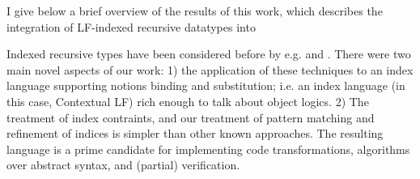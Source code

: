 \documentclass{article}
\begin{document}

I give below a brief overview of the results of this work, which
describes the integration of LF-indexed recursive datatypes into 

Indexed recursive types have been considered before
by e.g. \cite{Zenger:TCS97} and \cite{Xi99popl}. There were two main
novel aspects of our work:
1) the application of these techniques to an index language
supporting notions binding and substitution; i.e. an index language
(in this case, Contextual LF) rich enough to talk about object
logics. 2) The treatment of index contraints, and our treatment of
pattern matching and refinement of indices is simpler than other
known approaches. The resulting language is a prime candidate for
implementing code transformations, algorithms over abstract syntax,
and (partial) verification.
\end{document}
